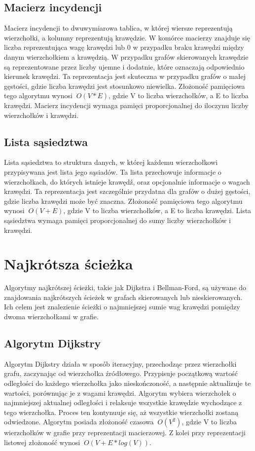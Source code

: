 \documentclass[11pt]{article}
\begin{document}
\subsection{Macierz incydencji}
Macierz incydencji to dwuwymiarowa tablica, w której wiersze reprezentują wierzchołki, a kolumny reprezentują krawędzie.
W komórce macierzy znajduje się liczba reprezentująca wagę krawędzi lub 0 w przypadku braku krawędzi między danym wierzchołkiem a krawędzią.
W przypadku grafów skierowanych krawędzie są reprezentowane przez liczby ujemne i dodatnie, które oznaczają odpowiednio kierunek krawędzi.
Ta reprezentacja jest skuteczna w przypadku grafów o małej gęstości, gdzie liczba krawędzi jest stosunkowo niewielka.
Złożoność pamięciowa tego algorytmu wynosi $\  O(V * E) $, gdzie V to liczba wierzchołków, a E to liczba krawędzi.
Macierz incydencji wymaga pamięci proporcjonalnej do iloczynu liczby wierzchołków i krawędzi.

\subsection{Lista sąsiedztwa}
Lista sąsiedztwa to struktura danych, w której każdemu wierzchołkowi przypisywana jest lista jego sąsiadów. Ta lista przechowuje informacje o wierzchołkach, do których istnieje krawędź, oraz opcjonalnie informacje o wagach krawędzi.
Ta reprezentacja jest szczególnie przydatna dla grafów o dużej gęstości, gdzie liczba krawędzi może być znaczna.
Złożoność pamięciowa tego algorytmu wynosi $\  O(V + E) $, gdzie V to liczba wierzchołków, a E to liczba krawędzi.
Lista sąsiedztwa wymaga pamięci proporcjonalnej do sumy liczby wierzchołków i krawędzi.

\section{Najkrótsza ścieżka}
Algorytmy najkrótszej ścieżki, takie jak Dijkstra i Bellman-Ford, są używane do znajdowania najkrótszych ścieżek w grafach skierowanych lub nieskierowanych.
Ich celem jest znalezienie ścieżki o najmniejszej sumie wag krawędzi pomiędzy dwoma wierzchołkami w grafie.
\subsection{Algorytm Dijkstry}
Algorytm Dijkstry działa w sposób iteracyjny, przechodząc przez wierzchołki grafu, zaczynając od wierzchołka źródłowego.
Przypisuje początkową wartość odległości do każdego wierzchołka jako nieskończoność, a następnie aktualizuje te wartości, porównując je z wagami krawędzi.
Algorytm wybiera wierzchołek o najmniejszej aktualnej odległości i relaksuje wszystkie krawędzie wychodzące z tego wierzchołka.
Proces ten kontynuuje się, aż wszystkie wierzchołki zostaną odwiedzone.
Algorytm posiada złożoność czasowa $\ O(V^2) $, gdzie V to liczba wierzchołków w grafie przy reprezentacji macierzowej. Z kolei przy reprezentacji listowej złożoność wynosi $\ O(V + E * log(V)) $.
\end{document}
